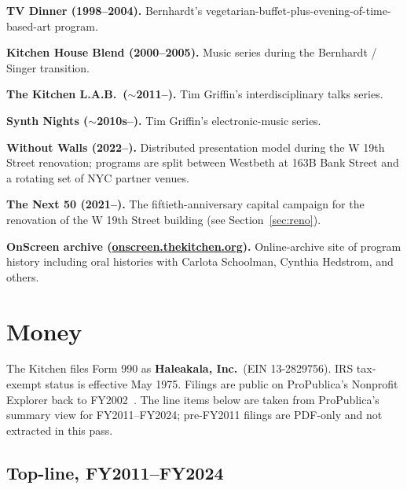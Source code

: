 \documentclass[10pt,letterpaper,twocolumn]{article}
\begin{document}
\textbf{TV Dinner (1998--2004).} Bernhardt's vegetarian-buffet-plus-evening-of-time-based-art program.

\textbf{Kitchen House Blend (2000--2005).} Music series during the Bernhardt / Singer transition.

\textbf{The Kitchen L.A.B.\ ($\sim$2011--).} Tim Griffin's interdisciplinary talks series.

\textbf{Synth Nights ($\sim$2010s--).} Tim Griffin's electronic-music series.

\textbf{Without Walls (2022--).} Distributed presentation model during the W 19th Street renovation; programs are split between Westbeth at 163B Bank Street and a rotating set of NYC partner venues.

\textbf{The Next 50 (2021--).} The fiftieth-anniversary capital campaign for the renovation of the W 19th Street building (see Section~\ref{sec:reno}).

\textbf{OnScreen archive (\url{onscreen.thekitchen.org}).} Online-archive site of program history including oral histories with Carlota Schoolman, Cynthia Hedstrom, and others.

\section{Money}\label{sec:money}

The Kitchen files Form 990 as \textbf{Haleakala, Inc.}~(EIN 13-2829756). IRS tax-exempt status is effective May 1975. Filings are public on ProPublica's Nonprofit Explorer back to FY2002~\citep{propublica_kitchen}. The line items below are taken from ProPublica's summary view for FY2011--FY2024; pre-FY2011 filings are PDF-only and not extracted in this pass.

\subsection{Top-line, FY2011--FY2024}
\end{document}
